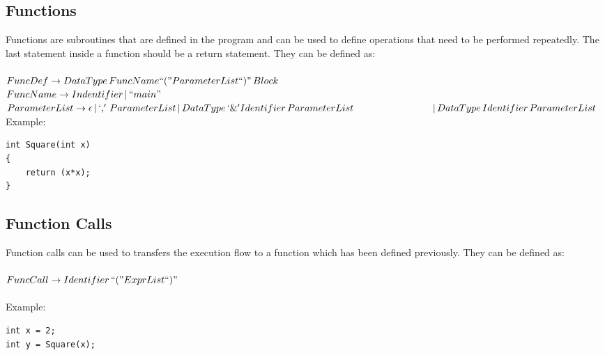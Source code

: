 \documentclass[12pt, a4paper]{article}
\begin{document}
			\subsection{Functions}
				Functions are subroutines that are defined in the program and can be used to define operations that need to be performed repeatedly. The last statement inside a function should be a return statement. They can be defined as: \\\\
				$ FuncDef \to DataType \, FuncName``("ParameterList``)" \, Block $ \\
				$FuncName \to Indentifier \,|\, ``main"$\\
				$ParameterList \to \epsilon \,|\, `,'\,ParameterList \,|\, DataType \,`\&' Identifier \, ParameterList \\
				~~~~~~~~~~~~~~~~~~~~~~~~\,|\,  DataType \, Identifier \, ParameterList$ \\
				Example:
\begin{lstlisting}
int Square(int x)
{
	return (x*x);
}
\end{lstlisting}
				
			\subsection{Function Calls}
				Function calls can be used to transfers the execution flow to a function which has been defined previously. They can be defined as: \\\\
				$ FuncCall  \to Identifier \, ``(" ExprList ``)" $ \\\\
				Example:
\begin{lstlisting}
int x = 2;
int y = Square(x);
\end{lstlisting}				
				
\end{document}
